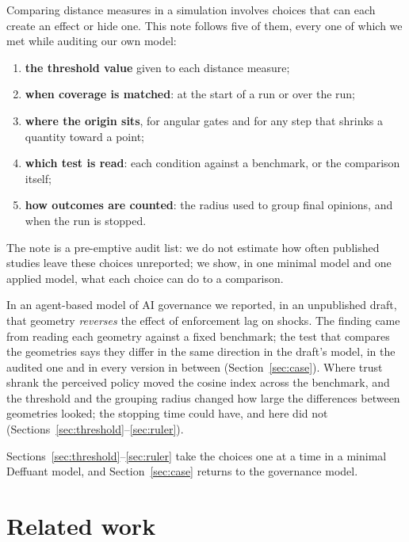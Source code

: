 \documentclass[11pt]{article}
\begin{document}
Comparing distance measures in a simulation involves choices that can each create an effect or hide one.
This note follows five of them, every one of which we met while auditing our own model:
\begin{enumerate}
\item \textbf{the threshold value} given to each distance measure;
\item \textbf{when coverage is matched}: at the start of a run or over the run;
\item \textbf{where the origin sits}, for angular gates and for any step that shrinks a quantity toward a point;
\item \textbf{which test is read}: each condition against a benchmark, or the comparison itself;
\item \textbf{how outcomes are counted}: the radius used to group final opinions, and when the run is stopped.
\end{enumerate}
The note is a pre-emptive audit list: we do not estimate how often published studies leave these choices unreported; we show, in one minimal model and one applied model, what each choice can do to a comparison.

In an agent-based model of AI governance we reported, in an unpublished draft, that geometry \emph{reverses} the effect of enforcement lag on shocks.
The finding came from reading each geometry against a fixed benchmark; the test that compares the geometries says they differ in the same direction in the draft's model, in the audited one and in every version in between (Section~\ref{sec:case}).
Where trust shrank the perceived policy moved the cosine index across the benchmark, and the threshold and the grouping radius changed how large the differences between geometries looked; the stopping time could have, and here did not (Sections~\ref{sec:threshold}--\ref{sec:ruler}).

Sections~\ref{sec:threshold}--\ref{sec:ruler} take the choices one at a time in a minimal Deffuant model, and Section~\ref{sec:case} returns to the governance model.

\section{Related work}
\label{sec:related}
\end{document}
